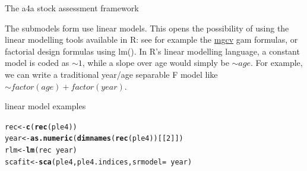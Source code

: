 \documentclass{beamer}\usepackage[]{graphicx}\usepackage[]{color}
\makeatletter
\newcommand{\hlnum}[1]{\textcolor[rgb]{0.686,0.059,0.569}{#1}}%
\newcommand{\hlopt}[1]{\textcolor[rgb]{0,0,0}{#1}}%
\newcommand{\hlstd}[1]{\textcolor[rgb]{0.345,0.345,0.345}{#1}}%
\newcommand{\hlkwb}[1]{\textcolor[rgb]{0.69,0.353,0.396}{#1}}%
\newcommand{\hlkwc}[1]{\textcolor[rgb]{0.333,0.667,0.333}{#1}}%
\newcommand{\hlkwd}[1]{\textcolor[rgb]{0.737,0.353,0.396}{\textbf{#1}}}%
\newenvironment{kframe}{%
 \def\at@end@of@kframe{}%
 \ifinner\ifhmode%
  \def\at@end@of@kframe{\end{minipage}}%
  \begin{minipage}{\columnwidth}%
 \fi\fi%
 \def\FrameCommand##1{\hskip\@totalleftmargin \hskip-\fboxsep
 \colorbox{shadecolor}{##1}\hskip-\fboxsep
     \hskip-\linewidth \hskip-\@totalleftmargin \hskip\columnwidth}%
 \MakeFramed {\advance\hsize-\width
   \@totalleftmargin\z@ \linewidth\hsize
   \@setminipage}}%
 {\par\unskip\endMakeFramed%
 \at@end@of@kframe}
\newenvironment{knitrout}{}{} %
\makeatother
\begin{document}
\begin{frame}{The a4a stock assessment framework}

The submodels form use linear models. This opens the possibility of using the linear modelling tools available in R: see for example the \href{http://cran.r-project.org/web/packages/mgcv/index.html}{mgcv} gam formulas, or factorial design formulas using lm(). In R's linear modelling language, a constant model is coded as $\sim 1$, while a slope over age would simply be $\sim age$. For example, we can write a traditional year/age separable F model like $\sim factor(age) + factor(year)$.

\end{frame}

\begin{frame}{linear model examples}

\begin{knitrout}
\color{fgcolor}\begin{kframe}
\begin{alltt}
\hlstd{rec} \hlkwb{<-} \hlkwd{c}\hlstd{(}\hlkwd{rec}\hlstd{(ple4))}
\hlstd{year} \hlkwb{<-} \hlkwd{as.numeric}\hlstd{(}\hlkwd{dimnames}\hlstd{(}\hlkwd{rec}\hlstd{(ple4))[[}\hlnum{2}\hlstd{]])}
\hlstd{rlm} \hlkwb{<-} \hlkwd{lm}\hlstd{(rec} \hlopt{~} \hlstd{year)}
\hlstd{scafit} \hlkwb{<-} \hlkwd{sca}\hlstd{(ple4, ple4.indices,} \hlkwc{srmodel} \hlstd{=} \hlopt{~}\hlstd{year)}
\end{alltt}
\end{kframe}
\end{knitrout}


\end{frame}
\end{document}

